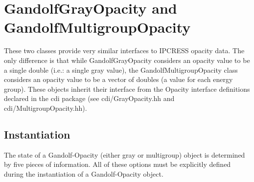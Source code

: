 \documentclass[11pt]{nmemo}
\begin{document}

\section{GandolfGrayOpacity and GandolfMultigroupOpacity}

These two classes provide very similar interfaces to IPCRESS opacity
data.  The only difference is that while GandolfGrayOpacity considers
an opacity value to be a single double (i.e.: a single gray value),
the GandolfMultigroupOpacity class considers an opacity value to be a
vector of doubles (a value for each energy group).   These objects
inherit their interface from the Opacity interface definitions
declared in the cdi package (see cdi/GrayOpacity.hh and
cdi/MultigroupOpacity.hh). 


\subsection{Instantiation}

The state of a Gandolf-Opacity (either gray or multigroup) object is
determined by five pieces of information.  All of these options must
be explicitly defined during the instantiation of a Gandolf-Opacity
object.   
\end{document}
